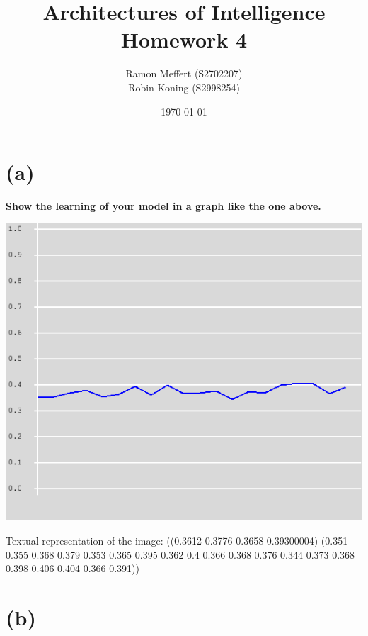 \documentclass[11pt,a4paper,titlepage]{article}
\title{Architectures of Intelligence \\ Homework 4}
\author{Ramon Meffert (S2702207) \\ Robin Koning (S2998254)}
\date{\today}
\begin{document}
\maketitle{}
\newpage

\section{(a)}
\label{sec:a}

\textbf{Show the learning of your model in a graph like the one
  above.}

\includegraphics[scale=0.5]{learning-graph}

Textual representation of the image:
((0.3612 0.3776 0.3658 0.39300004)
 (0.351 0.355 0.368 0.379 0.353 0.365 0.395 0.362 0.4 0.366 0.368 0.376 0.344
  0.373 0.368 0.398 0.406 0.404 0.366 0.391))

\section{(b)}
\label{sec:b}
\end{document}
